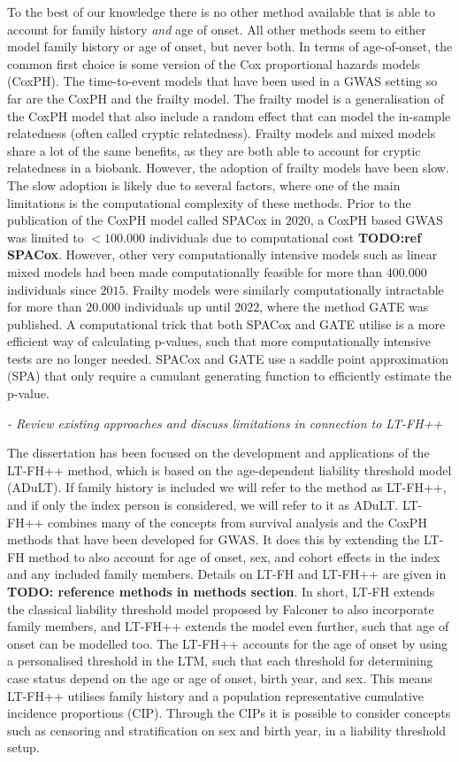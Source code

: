 To the best of our knowledge there is no other method available that is able to account for family history \textit{and} age of onset. 
All other methods seem to either model family history or age of onset, but never both. In terms of age-of-onset, the common first 
choice is some version of the Cox proportional hazards models (CoxPH). The time-to-event models that have been used in a GWAS setting 
so far are the CoxPH and the frailty model. The frailty model is a generalisation of the CoxPH model that also include a random effect 
that can model the in-sample relatedness (often called cryptic relatedness). Frailty models and mixed models share a lot of the same 
benefits, as they are both able to account for cryptic relatedness in a biobank. However, the adoption of frailty models have been 
slow. The slow
adoption is likely due to several factors, where one of the main limitations is the computational complexity of these methods. Prior 
to the publication of the CoxPH model called SPACox in $ 2020 $, a CoxPH based GWAS was limited to $ <100.000 $ individuals due to 
computational cost \textbf{TODO:ref SPACox}. However, other very computationally intensive models such as linear mixed models had been 
made computationally feasible for more than $ 400.000 $ individuals since $ 2015 $. Frailty models were similarly computationally 
intractable for more than $ 20.000 $ individuals up until $ 2022 $, where the method GATE was published. A computational trick that 
both SPACox and GATE utilise is a more efficient way of calculating p-values, such that more computationally intensive tests are no 
longer needed. SPACox and GATE use a saddle point approximation (SPA) that only require a cumulant generating function to efficiently 
estimate the p-value.


{\itshape
- Review existing approaches and discuss limitations in connection to LT-FH++
}

The dissertation has been focused on the development and applications of the LT-FH++ method, which is based on the age-dependent liability threshold model (ADuLT). If family history is included we will refer to the method as LT-FH++, and if only the index person is considered, we will refer to it as ADuLT. LT-FH++ combines many of the concepts from survival analysis and the CoxPH methods that have been developed for GWAS. It does this by extending the LT-FH method to also account for age of onset, sex, and cohort effects in the index and any included family members. Details on LT-FH and LT-FH++ are given in \textbf{TODO: reference methods in methods section}. In short, LT-FH extends the classical liability threshold model proposed by Falconer to also incorporate family members, and LT-FH++ extends the model even further, such that age of onset can be modelled too. The LT-FH++ accounts for the age of onset by using a personalised threshold in the LTM, such that each threshold for determining case status depend on the age or age of onset, birth year, and sex. This means LT-FH++ utilises family history and a population representative cumulative incidence proportions (CIP). Through the CIPs it is possible to consider concepts such as censoring and stratification on sex and birth year, in a liability threshold setup.

